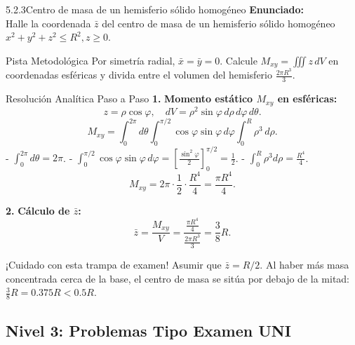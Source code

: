 \documentclass[11pt,a4paper]{article}
\begin{document}
\begin{nivelbox}{5.2.3}{Centro de masa de un hemisferio sólido homogéneo}
\textbf{Enunciado:}\\
Halle la coordenada $\bar{z}$ del centro de masa de un hemisferio sólido homogéneo $x^2 + y^2 + z^2 \le R^2, z \ge 0$.

\begin{observacionbox}{Pista Metodológica}
Por simetría radial, $\bar{x} = \bar{y} = 0$. Calcule $M_{xy} = \iiint z \, dV$ en coordenadas esféricas y divida entre el volumen del hemisferio $\frac{2\pi R^3}{3}$.
\end{observacionbox}

\begin{ejerciciobox}{Resolución Analítica Paso a Paso}
\smallskip\noindent\textbf{1.} \textbf{Momento estático $M_{xy}$ en esféricas:}
\[z = \rho\cos\varphi, \quad dV = \rho^2 \sin\varphi \, d\rho \, d\varphi \, d\theta.\]
\[M_{xy} = \int_0^{2\pi} d\theta \int_0^{\pi/2} \cos\varphi\sin\varphi \, d\varphi \int_0^R \rho^3 \, d\rho.\]
- $\int_0^{2\pi} d\theta = 2\pi$.
- $\int_0^{\pi/2} \cos\varphi\sin\varphi \, d\varphi = \left[ \frac{\sin^2\varphi}{2} \right]_0^{\pi/2} = \frac{1}{2}$.
- $\int_0^R \rho^3 d\rho = \frac{R^4}{4}$.
\[M_{xy} = 2\pi \cdot \frac{1}{2} \cdot \frac{R^4}{4} = \frac{\pi R^4}{4}.\]

\smallskip\noindent\textbf{2.} \textbf{Cálculo de $\bar{z}$:}
\[\bar{z} = \frac{M_{xy}}{V} = \frac{\frac{\pi R^4}{4}}{\frac{2\pi R^3}{3}} = \frac{3}{8} R.\]
\end{ejerciciobox}

\begin{errorbox}{¡Cuidado con esta trampa de examen!}
Asumir que $\bar{z} = R/2$. Al haber más masa concentrada cerca de la base, el centro de masa se sitúa por debajo de la mitad: $\frac{3}{8} R = 0.375 R < 0.5 R$.
\end{errorbox}
\end{nivelbox}
\bigskip

\subsection{Nivel 3: Problemas Tipo Examen UNI}
\end{document}
